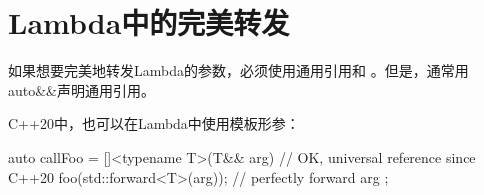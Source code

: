 \section{Lambda中的完美转发}
如果想要完美地转发Lambda的参数，必须使用通用引用和 。但是，通常用auto\&\&声明通用引用。

C++20中，也可以在Lambda中使用模板形参：

\begin{cppcode}
auto callFoo = []<typename T>(T&& arg) { // OK, universal reference since C++20
	foo(std::forward<T>(arg)); // perfectly forward arg
};
\end{cppcode}

